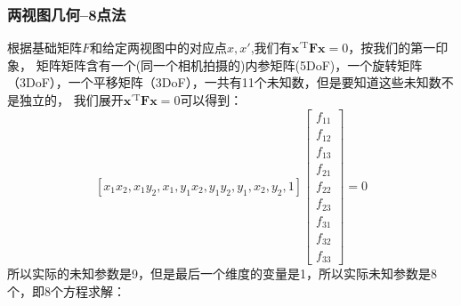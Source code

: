 \documentclass[12pt]{article}
\begin{document}
\subsubsection{两视图几何--8点法}
根据基础矩阵$F$和给定两视图中的对应点$x,x'$,我们有$\mathbf{x}^{\prime \mathrm{T}} \mathbf{F} \mathbf{x}=0$，按我们的第一印象，
矩阵矩阵含有一个(同一个相机拍摄的)内参矩阵(5DoF)，一个旋转矩阵（3DoF），一个平移矩阵（3DoF），一共有11个未知数，但是要知道这些未知数不是独立的，
我们展开$\mathbf{x}^{\prime \mathrm{T}} \mathbf{F} \mathbf{x}=0$可以得到：
\begin{equation}
    \left[x_{1} x_{2}, x_{1} y_{2}, x_{1}, y_{1} x_{2}, y_{1} y_{2}, y_{1}, x_{2}, y_{2}, 1\right]\left[\begin{array}{c}
        f_{11} \\
        f_{12} \\
        f_{13} \\
        f_{21} \\
        f_{22} \\
        f_{23} \\
        f_{31} \\
        f_{32} \\
        f_{33}
        \end{array}\right]=0
\end{equation}
所以实际的未知参数是9，但是最后一个维度的变量是1，所以实际未知参数是8个，即8个方程求解：
\end{document}
